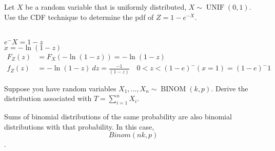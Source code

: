 \documentclass[answers]{exam}
\begin{document}
\begin{questions}
\question 
Let \(X\) be a random variable that is uniformly distributed, 
\(X\sim\operatorname{UNIF}(0,1)\). 
Use the CDF technique to determine the pdf of \(Z=1-e^{-X}\).
\begin{solution} \\
	\(e^-X=1-z\)\\
	\(x=-\ln(1-z)\) \\
	\begin{align*}
		F_Z(z) &= F_X(-\ln(1-z)) = -\ln(1-z) \\
		f_Z(z) &= -\ln(1-z) \ dz = \frac{-1}{(1-z)}
		\quad 0<z<(1-e)^-(x=1) = (1-e)^-1
	\end{align*}
\end{solution}

\question 
Suppose you have random variables \(X_1,\ldots,X_n \sim \operatorname{BINOM}(k,p)\). Derive the distribution associated with \(T=\sum_{i=1}^{n}X_i\).
\begin{solution}
	Sums of binomial distributions of the same probability are also 
	binomial distributions with that probability.
	In this case, \[Binom(nk,p)\].
\end{solution}

\end{questions}
\end{document}
